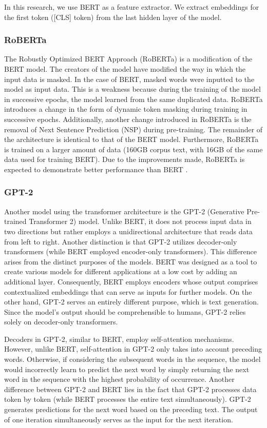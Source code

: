 In this research, we use BERT as a feature extractor. We extract embeddings for the first token ([CLS] token) from the last hidden layer of the model.

\subsubsection{RoBERTa}
The Robustly Optimized BERT Approach (RoBERTa) is a modification of the BERT model. The creators of the model have modified the way in which the input data is masked. In the case of BERT, masked words were inputted to the model as input data. This is a weakness because during the training of the model in successive epochs, the model learned from the same duplicated data. RoBERTa introduces a change in the form of dynamic token masking during training in successive epochs. Additionally, another change introduced in RoBERTa is the removal of Next Sentence Prediction (NSP) during pre-training. The remainder of the architecture is identical to that of the BERT model.
Furthermore, RoBERTa is trained on a larger amount of data (160GB corpus text, with 16GB of the same data used for training BERT).
Due to the improvements made, RoBERTa is expected to demonstrate better performance than BERT \autocite{Liu2019}.

\subsubsection{GPT-2}
Another model using the transformer architecture is the GPT-2 (Generative Pre-trained Transformer 2) model. Unlike BERT, it does not process input data in two directions but rather employs a unidirectional architecture that reads data from left to right. Another distinction is that GPT-2 utilizes decoder-only transformers (while BERT employed encoder-only transformers). This difference arises from the distinct purposes of the models. BERT was designed as a tool to create various models for different applications at a low cost by adding an additional layer. Consequently, BERT employs encoders whose output comprises contextualized embeddings that can serve as inputs for further models. On the other hand, GPT-2 serves an entirely different purpose, which is text generation. Since the model's output should be comprehensible to humans, GPT-2 relies solely on decoder-only transformers.

Decoders in GPT-2, similar to BERT, employ self-attention mechanisms. However, unlike BERT, self-attention in GPT-2 only takes into account preceding words. Otherwise, if considering the subsequent words in the sequence, the model would incorrectly learn to predict the next word by simply returning the next word in the sequence with the highest probability of occurrence. Another difference between GPT-2 and BERT lies in the fact that GPT-2 processes data token by token (while BERT processes the entire text simultaneously). GPT-2 generates predictions for the next word based on the preceding text. The output of one iteration simultaneously serves as the input for the next iteration.


